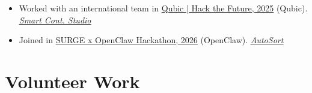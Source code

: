 \documentclass[a4paper,12pt]{article}
\begin{document}
\begin{itemize}
{    }
    \item Worked with an international team in \href{https://lablab.ai/ai-hackathons/qubic-hack-the-future/status-code-200/qubic-smart-contract-studio}{Qubic | Hack the Future, 2025} (Qubic).
    \hfill \textit{
        \href{https://www.linkedin.com/posts/aahmedfaraz_qubic-lablabai-blockchain-activity-7403681197790408704-Aq7n?utm_source=share&utm_medium=member_desktop&rcm=ACoAADdJH-cBzPnm9JIV3RhrpK_TvX28bFX_rEY}{\underline{Smart Cont. Studio}}
    }
    \item Joined in \href{https://lablab.ai/ai-hackathons/openclaw-surge-hackathon}{SURGE x OpenClaw Hackathon, 2026} (OpenClaw).
    \hfill \textit{
        \href{https://lablab.ai/ai-hackathons/openclaw-surge-hackathon/triton/autosort}{\underline{AutoSort}}
    }
\end{itemize}


\section*{Volunteer Work}
\end{document}
